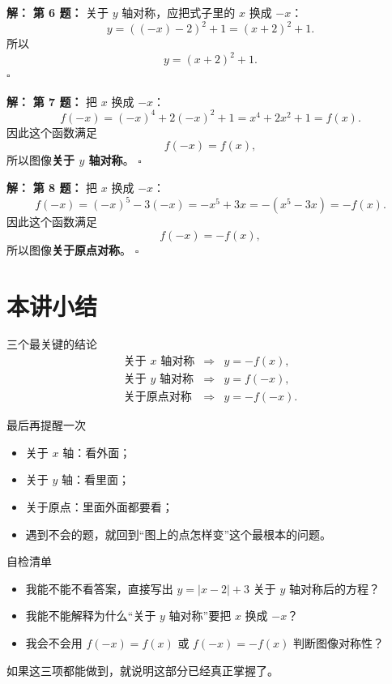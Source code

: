 \documentclass[11pt,a4paper,fontset=fandol]{ctexart}
\theoremstyle{formaltheorem}
\theoremstyle{formalexample}
\newenvironment{solution}{\par\noindent\textbf{解：}}{\hfill$\square$\par}
\begin{document}
\begin{solution}
\textbf{第 6 题：}
关于 $y$ 轴对称，应把式子里的 $x$ 换成 $-x$：
\[
y=((-x)-2)^2+1=(x+2)^2+1.
\]
所以
\[
\boxed{y=(x+2)^2+1}.
\]
\end{solution}

\begin{solution}
\textbf{第 7 题：}
把 $x$ 换成 $-x$：
\[
f(-x)=(-x)^4+2(-x)^2+1=x^4+2x^2+1=f(x).
\]
因此这个函数满足
\[
f(-x)=f(x),
\]
所以图像\textbf{关于 $y$ 轴对称}。
\end{solution}

\begin{solution}
\textbf{第 8 题：}
把 $x$ 换成 $-x$：
\[
f(-x)=(-x)^5-3(-x)=-x^5+3x=-(x^5-3x)=-f(x).
\]
因此这个函数满足
\[
f(-x)=-f(x),
\]
所以图像\textbf{关于原点对称}。
\end{solution}

\section{本讲小结}

\begin{goalbox}{三个最关键的结论}
\[
\begin{array}{rcl}
\text{关于 }x\text{ 轴对称} &\Longrightarrow& y=-f(x),\\[0.4em]
\text{关于 }y\text{ 轴对称} &\Longrightarrow& y=f(-x),\\[0.4em]
\text{关于原点对称} &\Longrightarrow& y=-f(-x).
\end{array}
\]
\end{goalbox}

\begin{skillbox}{最后再提醒一次}
\begin{itemize}
  \item 关于 $x$ 轴：看外面；
  \item 关于 $y$ 轴：看里面；
  \item 关于原点：里面外面都要看；
  \item 遇到不会的题，就回到“图上的点怎样变”这个最根本的问题。
\end{itemize}
\end{skillbox}

\begin{notebox}{自检清单}
\begin{itemize}
  \item 我能不能不看答案，直接写出 $y=|x-2|+3$ 关于 $y$ 轴对称后的方程？
  \item 我能不能解释为什么“关于 $y$ 轴对称”要把 $x$ 换成 $-x$？
  \item 我会不会用 $f(-x)=f(x)$ 或 $f(-x)=-f(x)$ 判断图像对称性？
\end{itemize}
如果这三项都能做到，就说明这部分已经真正掌握了。
\end{notebox}
\end{document}
